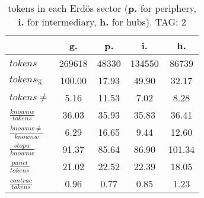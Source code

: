 \begin{table}[h!]
\begin{center}
\begin{tabular}{| l | c | c | c | c |}\hline
 & g. & p. & i. & h. \\\hline
$tokens$ & 269618  & 48330  & 134550  & 86739 \\\hline
$tokens_{\%}$ & 100.00  & 17.93  & 49.90  & 32.17 \\\hline
$tokens \neq$ & 5.16  & 11.53  & 7.02  & 8.28 \\\hline
$\frac{knownw}{tokens}$ & 36.03  & 35.93  & 35.83  & 36.41 \\\hline
$\frac{knownw \neq}{knownw}$ & 6.29  & 16.65  & 9.44  & 12.60 \\\hline
$\frac{stopw}{knownw}$ & 91.37  & 85.64  & 86.90  & 101.34 \\\hline
$\frac{punct}{tokens}$ & 21.02  & 22.52  & 22.39  & 18.05 \\\hline
$\frac{contrac}{tokens}$ & 0.96  & 0.77  & 0.85  & 1.23 \\\hline
\end{tabular}
\caption{tokens in each Erd\"os sector ({{\bf p.}} for periphery, {{\bf i.}} for intermediary, 
    {{\bf h.}} for hubs). TAG: 2}
\end{center}
\end{table}